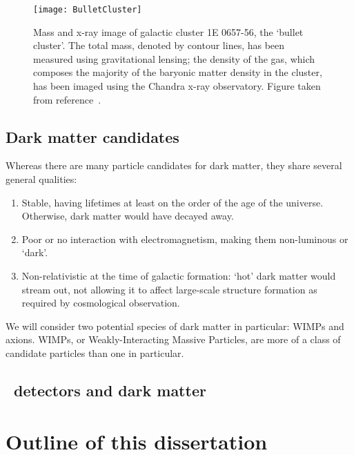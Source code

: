 			\begin{figure}
				\centering
				\texttt{[image: BulletCluster]}
				\caption[Mass and x-ray image of galactic cluster 1E 0657-56.]{Mass and x-ray image of galactic cluster 1E 0657-56, 
				the `bullet cluster'.   The total mass, denoted by contour lines, has been measured using gravitational lensing; the 
				density of the gas, which composes the majority of the baryonic matter density in the cluster, has been imaged 
				using the Chandra x-ray observatory.  %
				Figure taken from reference~\cite{Clowe06}.}
				\label{fig:DMBulletCluster}
			\end{figure}	
	
		\subsection{Dark matter candidates}
	
	Whereas there are many particle candidates for dark matter, they share several general qualities:

	
	
			\begin{enumerate}	
				\item Stable, having lifetimes at least on the order of the age of the universe.  Otherwise, dark matter would have
				decayed away.  
				\item Poor or no interaction with electromagnetism, making them non-luminous or `dark'.
				\item Non-relativistic at the time of galactic formation: `hot' dark matter would stream out, not allowing it 
				to affect large-scale structure formation as required by cosmological observation.  
			\end{enumerate}		

We will consider two potential species of dark matter in particular: WIMPs and axions.  WIMPs, or Weakly-Interacting Massive Particles, are more of a class of candidate particles than one in particular.  
	
	
			\begin{figure}
				\centering
				\def\figheight{0.4\textwidth}
				\caption{}
				\label{fig:WIMPExample}
			\end{figure}	
		
		
		\subsection{\ppc~detectors and dark matter}
	
	\section{Outline of this dissertation}
